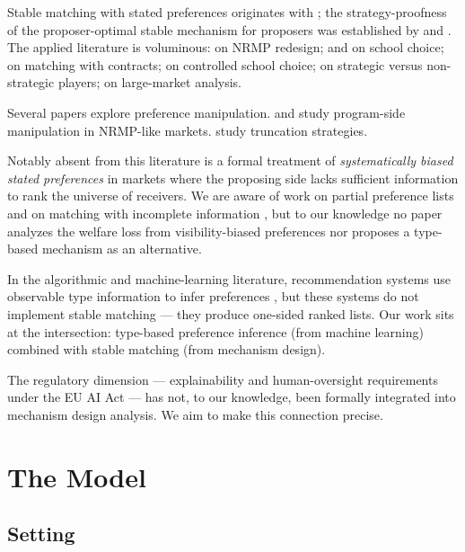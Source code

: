 \documentclass[11pt,a4paper]{article}
\begin{document}
Stable matching with stated preferences originates with \citet{galeShapley1962}; the strategy-proofness of the proposer-optimal stable mechanism for proposers was established by \citet{dubinsFreedman1981} and \citet{roth1982}. The applied literature is voluminous: \citet{rothPeranson1999} on NRMP redesign; \citet{abdulkadirogluSonmez2003} and \citet{abdulkadirogluPathakRoth2005,abdulkadirogluPathakRoth2009} on school choice; \citet{hatfieldMilgrom2005} on matching with contracts; \citet{echeniqueYenmez2007} on controlled school choice; \citet{pathakSonmez2008} on strategic versus non-strategic players; \citet{azevedoHatfield2018} on large-market analysis.

Several papers explore preference manipulation. \citet{roth1985} and \citet{sonmez1997} study program-side manipulation in NRMP-like markets. \citet{ashlagiKlijn2012} study truncation strategies.

Notably absent from this literature is a formal treatment of \emph{systematically biased stated preferences} in markets where the proposing side lacks sufficient information to rank the universe of receivers. We are aware of work on partial preference lists \citep{manlove2013} and on matching with incomplete information \citep{liu2020}, but to our knowledge no paper analyzes the welfare loss from visibility-biased preferences nor proposes a type-based mechanism as an alternative.

In the algorithmic and machine-learning literature, recommendation systems use observable type information to infer preferences \citep{koren2009,bobadilla2013}, but these systems do not implement stable matching --- they produce one-sided ranked lists. Our work sits at the intersection: type-based preference inference (from machine learning) combined with stable matching (from mechanism design).

The regulatory dimension --- explainability and human-oversight requirements under the EU AI Act --- has not, to our knowledge, been formally integrated into mechanism design analysis. We aim to make this connection precise.

\section{The Model}
\label{sec:model}

\subsection{Setting}
\end{document}
